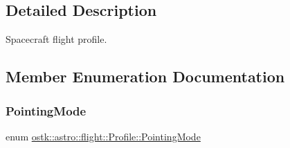 \subsection{Detailed Description}
Spacecraft flight profile. 

\subsection{Member Enumeration Documentation}
\mbox{\label{classostk_1_1astro_1_1flight_1_1_profile_a01d9e77f30ba7131c70e81d12b237ea4}} 
\subsubsection{\texorpdfstring{Pointing\+Mode}{PointingMode}}
{\footnotesize\ttfamily enum \hyperlink{classostk_1_1astro_1_1flight_1_1_profile_a01d9e77f30ba7131c70e81d12b237ea4}{ostk\+::astro\+::flight\+::\+Profile\+::\+Pointing\+Mode}\hspace{0.3cm}{\ttfamily [strong]}}

